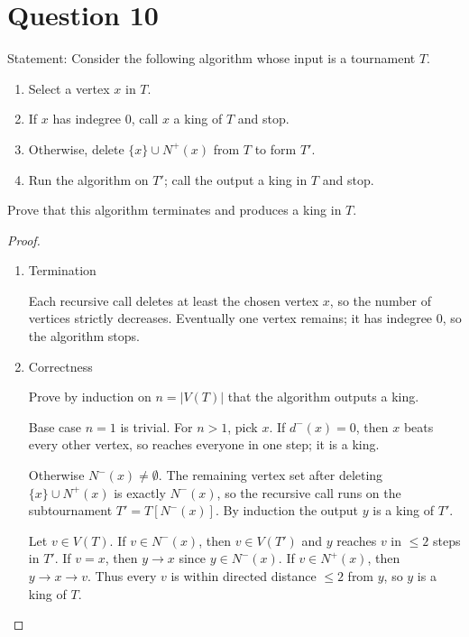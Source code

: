 \documentclass[11pt]{article}
\begin{document}
\newpage
\section*{Question 10}
\noindent Statement: Consider the following algorithm whose input is a tournament $T$.
\begin{enumerate}[label=(\arabic*)]
\item Select a vertex $x$ in $T$.
\item If $x$ has indegree $0$, call $x$ a king of $T$ and stop.
\item Otherwise, delete $\{x\}\cup N^+(x)$ from $T$ to form $T'$.
\item Run the algorithm on $T'$; call the output a king in $T$ and stop.
\end{enumerate}
Prove that this algorithm terminates and produces a king in $T$.

\medskip
\begin{proof}
~
\begin{enumerate}
    \item Termination
    
    Each recursive call deletes at least the chosen vertex $x$,
so the number of vertices strictly decreases. Eventually one vertex remains; it has indegree $0$,
so the algorithm stops.

\item Correctness

Prove by induction on $n=|V(T)|$ that the algorithm outputs a king.

Base case $n=1$ is trivial. For $n>1$, pick $x$.
If $d^-(x)=0$, then $x$ beats every other vertex, so reaches everyone in one step; it is a king.

Otherwise $N^-(x)\neq\emptyset$. The remaining vertex set after deleting $\{x\}\cup N^+(x)$ is exactly $N^-(x)$,
so the recursive call runs on the subtournament $T'=T[N^-(x)]$.
By induction the output $y$ is a king of $T'$.

Let $v\in V(T)$.
If $v\in N^-(x)$, then $v\in V(T')$ and $y$ reaches $v$ in $\le 2$ steps in $T'$.
If $v=x$, then $y\to x$ since $y\in N^-(x)$.
If $v\in N^+(x)$, then $y\to x\to v$.
Thus every $v$ is within directed distance $\le 2$ from $y$, so $y$ is a king of $T$.
\end{enumerate}
\end{proof}
\end{document}
